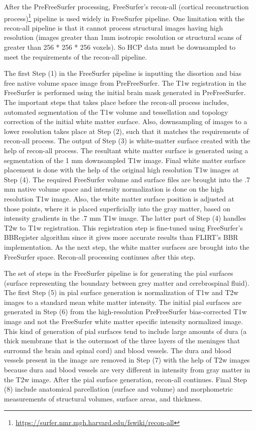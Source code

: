 After the PreFreeSurfer processing, FreeSurfer's recon-all (cortical reconstruction process)\footnote{\url{https://surfer.nmr.mgh.harvard.edu/fswiki/recon-all}} pipeline is used widely in FreeSurfer pipeline. One limitation with the recon-all pipeline is that it cannot process structural images having high resolution (images greater than 1mm isotropic resolution or structural scans of greater than 256 * 256 * 256 voxels). So HCP data must be downsampled to meet the requirements of the recon-all pipeline.

The first Step (1) in the FreeSurfer pipeline is inputting the disortion and bias free native volume space image from PreFreeSurfer. The T1w registration in the FreeSurfer is performed using the initial brain mask generated in PreFreeSurfer. The important steps that takes place before the recon-all process includes, automated segmentation of the T1w volume and tessellation and topology correction of the initial white matter surface. Also, downsampling of images to a lower resolution takes place at Step (2), such that it matches the requirements of recon-all process. The output of Step (3) is white-matter surface created with the help of recon-all process. The resultant white matter surface is generated using a segmentation of the 1 mm downsampled T1w image. 
Final white matter surface placement is done with the help of the 
original high resolution T1w images at Step (4). The required 
FreeSurfer volume and surface files are brought into the .7 mm native 
volume space and intensity normalization is done on the high resolution 
T1w image. Also, the white matter surface position is adjusted at those 
points, where it is placed superficially into the gray matter, 
based on intensity gradients in the .7 mm T1w image. The latter part of 
Step (4) handles T2w to T1w registration. This registration step is 
fine-tuned using FreeSurfer's BBRegister algorithm since it gives more 
accurate results than FLIRT's BBR implementation. As the next step, the white matter surfaces 
are brought into the FreeSurfer space. Recon-all processing continues after this step.~\cite{Gla13} %

The set of steps in the FreeSurfer pipeline is for generating the pial 
surfaces (surface representing the boundary between grey matter and cerebrospinal fluid). The first Step (5) in pial surface generation is 
normalization of T1w and T2w images to a standard mean white matter 
intensity. The initial pial surfaces are generated in Step (6) from the 
high-resolution PreFreeSurfer bias-corrected T1w image and not the 
FreeSurfer white matter specific intensity normalized image. This kind 
of generation of pial surfaces tend to include large amounts of dura (a 
thick membrane that is the outermost of the three layers of the 
meninges that surround the brain and spinal cord) and blood vessels. 
The dura and blood vessels present in the image are removed in Step (7) with 
the help of T2w images because dura and blood vessels are very different 
in intensity from gray matter in the T2w image.
After the pial surface generation, recon-all continues. 
Final Step (8) include anatomical parcellation (surface and volume) and morphometric measurements of structural volumes, surface areas, and thickness.~\cite{Gla13}

